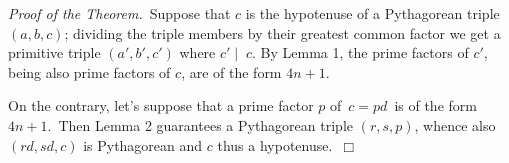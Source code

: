 \documentclass[12pt]{article}
\begin{document}
{\it Proof of the Theorem.}\, Suppose that $c$ is the 
hypotenuse of a Pythagorean triple $(a, b, c)$; dividing the 
triple members by their greatest common factor we get a 
primitive triple $(a'\!, b'\!, c')$ where\; $c'\mid\;c$.\; By 
Lemma 1, the prime factors of $c'$, being also prime factors of 
$c$, are of the form $4n\!+\!1$.

On the contrary, let's suppose that a prime factor $p$ of\, 
$c = pd$\, is of the form $4n\!+\!1$.\, Then Lemma 2 guarantees 
a Pythagorean triple $(r, s, p)$, whence also $(rd, sd, c)$ is 
Pythagorean and $c$ thus a hypotenuse.\, $\Box$\\
\end{document}
